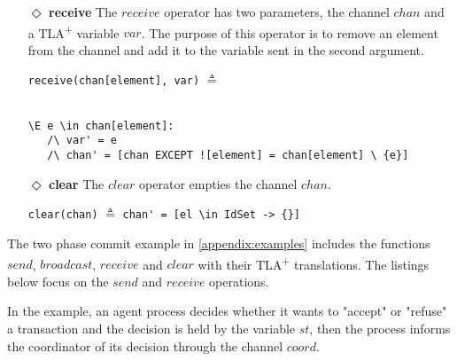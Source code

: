 \documentclass{thesul}
\newcommand{\tlaplus}{TLA\textsuperscript{+}\xspace}
\begin{document}
\begin{itemize}
\begin{minipage}{.4\textwidth}

\lstinline!multicast(chan, [a \in sub |-> msg])! $\triangleq$\\\\\\
\end{minipage}\hfill
\begin{minipage}{.8\textwidth}
\begin{lstlisting}[frame = none, numbers = none]
chan' = a \in DOMAIN chan |-> 
					IF a \in sub
					THEN chan[a] \cup {msg}
					ELSE chan[a]
\end{lstlisting}

\end{minipage}\hfill

\item[$\Diamond$]  \textbf{receive}
The $receive$ operator has two parameters, the channel $chan$ and a \tlaplus variable $var$. The purpose of this operator is to remove an element from the channel and add it to the variable sent in the second argument.

\begin{minipage}{.33\textwidth}

\lstinline|receive(chan[element], var)| $\triangleq$\\\\
\end{minipage}\hfill
\begin{minipage}{\textwidth}
\begin{lstlisting}[frame = none, numbers = none]
\E e \in chan[element]:
   /\ var' = e
   /\ chan' = [chan EXCEPT ![element] = chan[element] \ {e}]
\end{lstlisting}

\end{minipage}\hfill

\item[$\Diamond$]  \textbf{clear}
The $clear$ operator empties the channel $chan$.

\lstinline|clear(chan)| $\triangleq$
\lstinline|chan' = [el \in IdSet -> {}]|

\end{itemize}

The two phase commit example in \ref{appendix:examples} includes the functions $send$, $broadcast$, $receive$ and $clear$ with their \tlaplus translations. The listings below focus on the $send$ and $receive$ operations.

In the example, an agent process decides whether it wants to "accept" or "refuse" a transaction and the decision is held by the variable $st$, then the process informs the coordinator of its decision through the channel $coord$.
\end{document}
